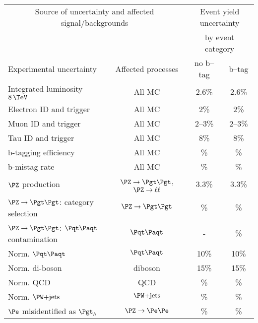 
\begin{table}[tbhp]
\begin{center}
    \begin{tabular}{|l|c|c|c|}
    \hline
    \multicolumn{2}{|c|}{Source of uncertainty and affected signal/backgrounds}
    & \multicolumn{2}{|c|}{Event yield uncertainty}  \\
    \multicolumn{2}{|c|}{} & \multicolumn{2}{|c|}{by event category} \\
    \hline
     Experimental uncertainty                                  & Affected processes &  no b--tag     &  b--tag      \\
     \hline
     Integrated luminosity $8\,\TeV$                           & All MC & 2.6\% & 2.6\%       \\
     Electron ID and trigger                                   & All MC &  2\%  & 2\%       \\
     Muon ID and trigger                                       & All MC & 2--3\%       &   2--3\%        \\
     Tau ID and trigger                                        & All MC & 8\%  & 8\%           \\
     b-tagging efficiency                                      & All MC & \% &   \%  \\
     b-mistag rate                                             & All MC & \% & \%    \\
     \hline
     $\PZ$ production                                          & $\ZToTauTau$, $\PZ\to\ell\ell$ & 3.3\%     &   3.3\%      \\
     $\PZ\to\Pgt\Pgt$: category selection                      & $\ZToTauTau$ & \%  & \%        \\
     $\PZ\to\Pgt\Pgt$: $\ttbar$ contamination                  & $\ttbar$ & - & \%  \\
     Norm. $\ttbar$                                            & $\ttbar$ & 10\%  &   10\%        \\
     Norm. di-boson                                            & diboson & 15\%  &  15\%      \\
     Norm. QCD                                                 & QCD  & \%    &   \%         \\
     Norm. $\WJets$                                            & $\WJets$ & \% &  \%              \\
     $\Pe$ misidentified as $\Pgth$                            & $\PZ\to\Pe\Pe$ & \%   & \%      \\

\end{tabular}
\end{center}
\end{table}
